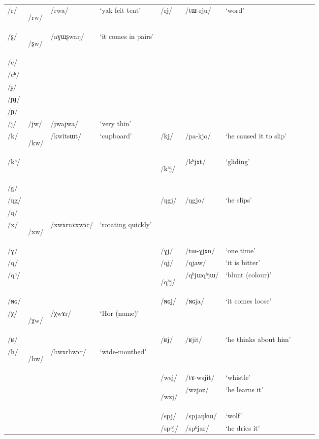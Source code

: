 \documentclass[oneside,a4paper,11pt]{article}
\newcommand{\ipa}[1]{\mbox{\phon/#1/}}
\newcommand{\deux}[1]{\ipa{#1}\addtocounter{2clusters}{1}}
\newcommand{\trois}[1]{\ipa{#1}\addtocounter{3clusters}{1}}
\newcommand{\tib}[1]{\cellcolor{lightgray}\textbf{#1}}
\newcommand{\idph}[1]{\cellcolor{gray}\textbf{#1}}
\begin{document}
\begin{table}
{\begin{tabular}{llllllllll}
\ipa{r} &\deux{rw}\tib{} &\ipa{rwa} & `yak felt tent' &\deux{rj} &\ipa{tɯ-rju} & `word' \\ 
\ipa{ʂ} &\deux{ʂw} \tib{} &\ipa{aɣɯʂwaŋ} & `it comes in pairs' & & &\\ 
\ipa{c} & & & & & &\\ 
\ipa{cʰ} & & & & & &\\ 
\ipa{ɟ} & & & & & &\\ 
\ipa{ɲɟ} & & & & & &\\ 
\ipa{ɲ} & & & & & &\\ 
\ipa{j} &\deux{jw} &\ipa{jwajwa} & `very thin' & & &\\ 
\ipa{k} &\deux{kw}\tib{} &\ipa{kwitsɯt} & `cupboard' &\deux{kj} &\ipa{pa-kjo} & `he caused it to slip' \\ 
\ipa{kʰ} & & & & \deux{kʰj} \idph{}& \ipa{kʰjɤt} & `gliding' \\ 
\ipa{g} & & & & & &\\ 
\ipa{ŋg} & & & &\deux{ŋgj} &\ipa{ŋgjo} & `he slips' \\ 
\ipa{ŋ} & & & & & &\\ 
\ipa{x} &\deux{xw}\idph{} & \ipa{xwɤrnɤxwɤr}& `rotating quickly' & & &\\ 
\ipa{ɣ} & & & &\deux{ɣj} &\ipa{tɯ-ɣjɤn} & `one time' \\ 
\ipa{q} & & & &\deux{qj} &\ipa{qjaw} & `it is bitter' \\ 
\ipa{qʰ} & & & &\deux{qʰj} \idph{} &\ipa{qʰjɯqʰjɯ} & `blunt (colour)' \\ 
\ipa{ɴɢ} & & & &\deux{ɴɢj} &\ipa{ɴɢja} & `it comes loose' \\ 
\ipa{χ} &\deux{χw} \tib{} &\ipa{χwɤr} & `Hor (name)' & & &\\ 
\ipa{ʁ} & & & &\deux{ʁj} &\ipa{ʁjit} & `he thinks about him' \\
\ipa{h} &\deux{hw} \idph{} &\ipa{hwɤrhwɤr} & `wide-mouthed' & & &\\ 
\midrule
 & & & &\trois{wsj} &\ipa{tɤ-wsjit} & `whistle' \\
 & & & &\trois{wzj}  \tib{} &\ipa{wzjoz} & `he learns it' \\
\midrule            
 & & & &\trois{spj} &\ipa{spjaŋkɯ} & `wolf' \\
 & & & &\trois{spʰj} &\ipa{spʰjar} & `he dries it' \\

\end{tabular}}
\end{table}
\end{document}
